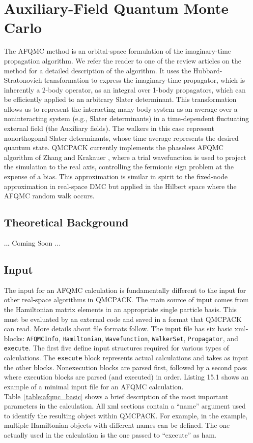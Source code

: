 \chapter{Auxiliary-Field Quantum Monte Carlo}
\label{chap:afqmc}
The AFQMC method is an orbital-space formulation of the imaginary-time propagation algorithm. We refer the reader to one of the review articles on the method \cite{AFQMC_review,PhysRevLett.90.136401,PhysRevE.70.056702} for a detailed description of the algorithm. It uses the Hubbard-Stratonovich transformation to express the imaginary-time propagator, which is inherently a 2-body operator, as an integral over 1-body propagators, which can be efficiently applied to an arbitrary Slater determinant. This transformation allows us to represent the interacting many-body system as an average over a noninteracting system (e.g., Slater determinants) in a time-dependent fluctuating external field (the Auxiliary fields). The walkers in this case represent nonorthogonal Slater determinants, whose time average represents the desired quantum state. QMCPACK currently implements the phaseless AFQMC algorithm of Zhang and Krakauer \cite{PhysRevLett.90.136401}, where a trial wavefunction is used to project the simulation to the real axis, controlling the fermionic sign problem at the expense of a bias. This approximation is similar in spirit to the fixed-node approximation in real-space DMC but applied in the Hilbert space where the AFQMC random walk occurs.     

\section{Theoretical Background}
... Coming Soon ...

\section{Input}

The input for an AFQMC calculation is fundamentally different to the input for other real-space algorithms in QMCPACK. The main source of input comes from the Hamiltonian matrix elements in an appropriate single particle basis. This must be evaluated by an external code and saved in a format that QMCPACK can read. More details about file formats follow. The input file has six basic xml-blocks: \texttt{AFQMCInfo}, \texttt{Hamiltonian}, \texttt{Wavefunction}, \texttt{WalkerSet}, \texttt{Propagator}, and \texttt{execute}. The first five define input structures required for various types of calculations. The \texttt{execute} block represents actual calculations and takes as input the other blocks. 
Nonexecution blocks are parsed first, followed by a second pass where execution blocks are parsed (and executed) in order. Listing 15.1 shows an example of a minimal input file for an AFQMC calculation. Table~\ref{table:afqmc_basic} shows a brief description of the most important parameters in the calculation. All xml sections contain a ``name'' argument used to identify the resulting object within QMCPACK. For example, in the example, multiple Hamiltonian objects with different names can be defined. The one actually used in the calculation is the one passed to ``execute'' as ham.

